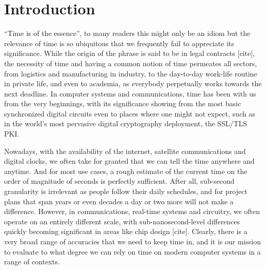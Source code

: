 
\section{Introduction}

``Time is of the essence'', to many readers this might only be an idiom but the relevance of time is so ubiquitous that we frequently fail to appreciate its significance. While the origin of the phrase is said to be in legal contracts [cite], the necessity of time and having a common notion of time permeates all sectors, from logistics and manufacturing in industry, to the day-to-day work-life routine in private life, and even to academia, as everybody perpetually works towards the next deadline. In computer systems and communications, time has been with us from the very beginnings, with its significance showing from the most basic synchronized digital circuits even to places where one might not expect, such as in the world's most pervasive digital cryptography deployment, the SSL/TLS PKI.

Nowadays, with the availability of the internet, satellite communications and digital clocks, we often take for granted that we can tell the time anywhere and anytime. And for most use cases, a rough estimate of the current time on the order of magnitude of seconds is perfectly sufficient.
After all, sub-second granularity is irrelevant as people follow their daily schedules, and for project plans that span years or even decades a day or two more will not make a difference. 
However, in communications, real-time systems and circuitry, we often operate on an entirely different scale, with sub-nanosecond-level differences quickly becoming significant in areas like chip design [cite]. Clearly, there is a very broad range of accuracies that we need to keep time in, and it is our mission to evaluate to what degree we can rely on time on modern computer systems in a range of contexts.